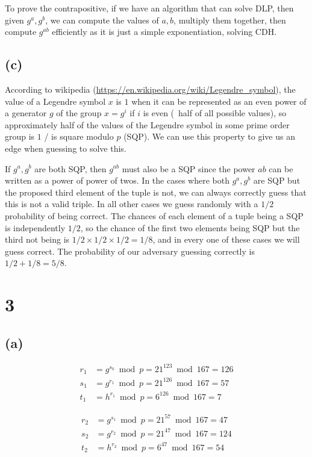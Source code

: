 \documentclass[11pt]{article}
\begin{document}
To prove the contrapositive, if we have an algorithm that can solve DLP, then given $g^a, g^b$, we can compute the values of $a, b$, multiply them together, then compute $g^{ab}$ efficiently as it is just a simple exponentiation, solving CDH.

\subsection{(c)}

According to wikipedia (\url{https://en.wikipedia.org/wiki/Legendre_symbol}), the value of a Legendre symbol $x$ is $1$ when it can be represented as an even power of a generator $g$ of the group $x = g^i$ if $i$ is even (~half of all possible values), so approximately half of the values of the Legendre symbol in some prime order group is $1$ / is square modulo $p$ (SQP). We can use this property to give us an edge when guessing to solve this.

If $g^a, g^b$ are both SQP, then $g^{ab}$ must also be a SQP since the power $ab$ can be written as a power of power of twos. In the cases where both $g^a, g^b$ are SQP but the proposed third element of the tuple is not, we can always correctly guess that this is not a valid triple. In all other cases we guess randomly with a $1/2$ probability of being correct. The chances of each element of a tuple being a SQP is independently $1/2$, so the chance of the first two elements being SQP but the third not being is $1/2 \times 1/2 \times 1/2 = 1/8$, and in every one of these cases we will guess correct. The probability of our adversary guessing correctly is $1/2 + 1/8 = 5/8$.

\newpage

\section{3}

\subsection{(a)}

$$
\begin{align*}
r_1 &= g^{s_0} \bmod p = 21^{123} \bmod 167 = 126 \\
s_1 &= g^{r_1} \bmod p = 21^{126} \bmod 167 = 57 \\
t_1 &= h^{r_1} \bmod p = 6^{126} \bmod 167 = 7
\end{align*}
$$

$$
\begin{align*}
r_2 &= g^{s_1} \bmod p = 21^{57} \bmod 167 = 47 \\
s_2 &= g^{r_2} \bmod p = 21^{47} \bmod 167 = 124 \\
t_2 &= h^{r_2} \bmod p = 6^{47} \bmod 167 = 54
\end{align*}
$$
\end{document}
